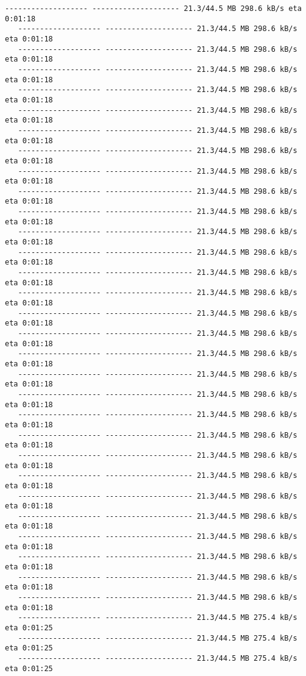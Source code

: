 \documentclass[11pt]{article}
\begin{document}
\begin{Verbatim}[commandchars=\\\{\}]
   ------------------- -------------------- 21.3/44.5 MB 298.6 kB/s eta 0:01:18
   ------------------- -------------------- 21.3/44.5 MB 298.6 kB/s eta 0:01:18
   ------------------- -------------------- 21.3/44.5 MB 298.6 kB/s eta 0:01:18
   ------------------- -------------------- 21.3/44.5 MB 298.6 kB/s eta 0:01:18
   ------------------- -------------------- 21.3/44.5 MB 298.6 kB/s eta 0:01:18
   ------------------- -------------------- 21.3/44.5 MB 298.6 kB/s eta 0:01:18
   ------------------- -------------------- 21.3/44.5 MB 298.6 kB/s eta 0:01:18
   ------------------- -------------------- 21.3/44.5 MB 298.6 kB/s eta 0:01:18
   ------------------- -------------------- 21.3/44.5 MB 298.6 kB/s eta 0:01:18
   ------------------- -------------------- 21.3/44.5 MB 298.6 kB/s eta 0:01:18
   ------------------- -------------------- 21.3/44.5 MB 298.6 kB/s eta 0:01:18
   ------------------- -------------------- 21.3/44.5 MB 298.6 kB/s eta 0:01:18
   ------------------- -------------------- 21.3/44.5 MB 298.6 kB/s eta 0:01:18
   ------------------- -------------------- 21.3/44.5 MB 298.6 kB/s eta 0:01:18
   ------------------- -------------------- 21.3/44.5 MB 298.6 kB/s eta 0:01:18
   ------------------- -------------------- 21.3/44.5 MB 298.6 kB/s eta 0:01:18
   ------------------- -------------------- 21.3/44.5 MB 298.6 kB/s eta 0:01:18
   ------------------- -------------------- 21.3/44.5 MB 298.6 kB/s eta 0:01:18
   ------------------- -------------------- 21.3/44.5 MB 298.6 kB/s eta 0:01:18
   ------------------- -------------------- 21.3/44.5 MB 298.6 kB/s eta 0:01:18
   ------------------- -------------------- 21.3/44.5 MB 298.6 kB/s eta 0:01:18
   ------------------- -------------------- 21.3/44.5 MB 298.6 kB/s eta 0:01:18
   ------------------- -------------------- 21.3/44.5 MB 298.6 kB/s eta 0:01:18
   ------------------- -------------------- 21.3/44.5 MB 298.6 kB/s eta 0:01:18
   ------------------- -------------------- 21.3/44.5 MB 298.6 kB/s eta 0:01:18
   ------------------- -------------------- 21.3/44.5 MB 298.6 kB/s eta 0:01:18
   ------------------- -------------------- 21.3/44.5 MB 298.6 kB/s eta 0:01:18
   ------------------- -------------------- 21.3/44.5 MB 298.6 kB/s eta 0:01:18
   ------------------- -------------------- 21.3/44.5 MB 298.6 kB/s eta 0:01:18
   ------------------- -------------------- 21.3/44.5 MB 298.6 kB/s eta 0:01:18
   ------------------- -------------------- 21.3/44.5 MB 275.4 kB/s eta 0:01:25
   ------------------- -------------------- 21.3/44.5 MB 275.4 kB/s eta 0:01:25
   ------------------- -------------------- 21.3/44.5 MB 275.4 kB/s eta 0:01:25

\end{Verbatim}
\end{document}
